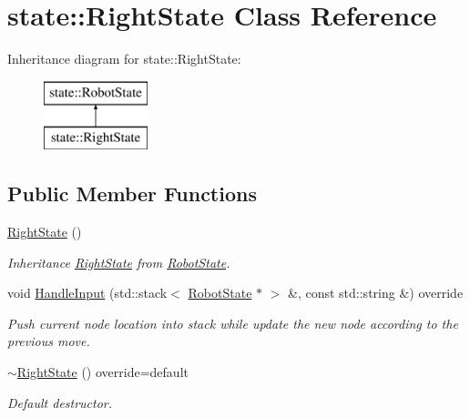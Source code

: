 \hypertarget{classstate_1_1_right_state}{}\section{state\+::Right\+State Class Reference}
\label{classstate_1_1_right_state}
Inheritance diagram for state\+::Right\+State\+:\begin{figure}[H]
\begin{center}
\leavevmode
\includegraphics[height=2.000000cm]{classstate_1_1_right_state}
\end{center}
\end{figure}
\subsection*{Public Member Functions}
\begin{DoxyCompactItemize}
\item 
\mbox{\label{classstate_1_1_right_state_a95627d81ab5dac053c52ca57f8b2c604}} 
\mbox{\hyperlink{classstate_1_1_right_state_a95627d81ab5dac053c52ca57f8b2c604}{Right\+State}} ()
\begin{DoxyCompactList}\small\item\em Inheritance \mbox{\hyperlink{classstate_1_1_right_state}{Right\+State}} from \mbox{\hyperlink{classstate_1_1_robot_state}{Robot\+State}}. \end{DoxyCompactList}\item 
\mbox{\label{classstate_1_1_right_state_a0ff6150d22215deb086531a13b7cc632}} 
void \mbox{\hyperlink{classstate_1_1_right_state_a0ff6150d22215deb086531a13b7cc632}{Handle\+Input}} (std\+::stack$<$ \mbox{\hyperlink{classstate_1_1_robot_state}{Robot\+State}} $\ast$ $>$ \&, const std\+::string \&) override
\begin{DoxyCompactList}\small\item\em Push current node location into stack while update the new node according to the previous move. \end{DoxyCompactList}\item 
\mbox{\label{classstate_1_1_right_state_a91041d139e4162fb1c122414021c2bd8}} 
\mbox{\hyperlink{classstate_1_1_right_state_a91041d139e4162fb1c122414021c2bd8}{$\sim$\+Right\+State}} () override=default
\begin{DoxyCompactList}\small\item\em Default destructor. \end{DoxyCompactList}\end{DoxyCompactItemize}


